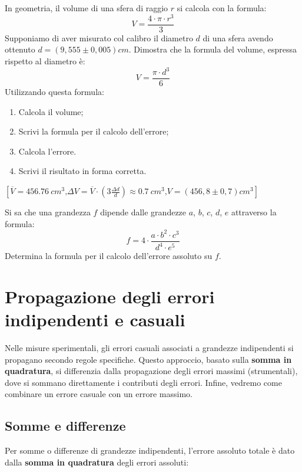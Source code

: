 \begin{esercizio}
In geometria, il volume di una sfera di raggio $r$ si calcola con la formula:
\[
V=\frac{4\cdot\pi \cdot r^3}{3}
\] 
Supponiamo di aver misurato col calibro il diametro $d$ di una sfera avendo ottenuto $d=\left(9,555 \pm 0,005\right)\si{cm}$. Dimostra che la formula del volume, espressa rispetto al diametro è:
\[
V=\frac{\pi \cdot d^3}{6}
\]
Utilizzando questa formula:
\begin{enumerate}
\item[a)] Calcola il volume;
\item[b)] Scrivi la formula per il calcolo dell'errore;
\item[c)] Calcola l'errore.
\item[d)] Scrivi il risultato in forma corretta.
\end{enumerate}
 \hspace*{\fill}   $\left[\overline{V}=\SI{456.76}{cm^3}\text{,} \Delta V=\overline{V}\cdot\left(3\frac{\Delta d}{d}\right)\approx\SI{0.7}{cm^3}\text{,} V=\left(456,8 \pm 0,7 \right)\si{cm^3}\right] $
\end{esercizio}
\vspace{0.2cm}
\begin{esercizio}
Si sa che una grandezza $f$ dipende dalle grandezze $a$, $b$, $c$, $d$, $e$ attraverso la formula:
\[
f = 4 \cdot \frac{a\cdot b^2 \cdot c^3}{d^4 \cdot e^5}
\]
Determina la formula per il calcolo dell'errore assoluto su $f$.\\

\end{esercizio}
\section{Propagazione degli errori indipendenti e casuali}

Nelle misure sperimentali, gli errori casuali associati a grandezze indipendenti si propagano secondo regole specifiche. Questo approccio, basato sulla \textbf{somma in quadratura}, si differenzia dalla propagazione degli errori massimi (strumentali), dove si sommano direttamente i contributi degli errori. Infine, vedremo come combinare un errore casuale con un errore massimo.

\subsection{Somme e differenze}
Per somme o differenze di grandezze indipendenti, l'errore assoluto totale è dato dalla \textbf{somma in quadratura} degli errori assoluti:

